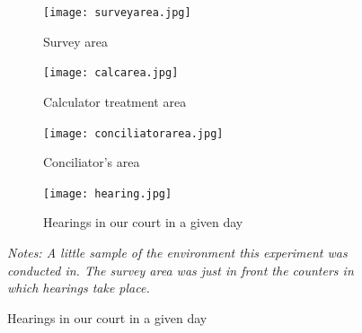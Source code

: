 \documentclass[11pt]{article}
\begin{document}
\begin{figure}[H]
    \label{figure_fotos}
    \caption{Implementation}
    \begin{center}
    \begin{subfigure}{0.4\textwidth}
        \caption{Survey area}
        \centering
        \texttt{[image: surveyarea.jpg]}
    \end{subfigure}
    \begin{subfigure}{0.4\textwidth}
        \caption{Calculator treatment area}
        \centering
        \texttt{[image: calcarea.jpg]}
    \end{subfigure}
    \hfill
       \begin{subfigure}{0.4\textwidth}
        \caption{Conciliator's area}
        \centering
        \texttt{[image: conciliatorarea.jpg]}
    \end{subfigure}
    \begin{subfigure}{0.4\textwidth}
        \caption{Hearings in our court in a given day}
        \centering
        \texttt{[image: hearing.jpg]}
    \end{subfigure} 
    
    \vspace{5mm}
    
     \footnotesize \textit{Notes: A little sample of the environment this experiment was conducted in. The survey area was just in front the counters in which hearings take place.}  
    \end{center}
\end{figure}




	
\pagebreak



%





% 
\end{document}
